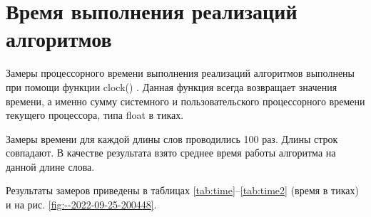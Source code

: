 \section{Время выполнения реализаций алгоритмов}

Замеры процессорного времени выполнения реализаций алгоритмов выполнены 
при помощи функции clock() \cite{cpplangtime}. Данная функция всегда возвращает значения времени, а именно сумму системного и пользовательского процессорного времени текущего процессора, типа float в тиках.

Замеры времени для каждой длины слов проводились 100 раз. Длины строк совпадают. В качестве результата взято среднее время работы алгоритма на данной длине слова.

Результаты замеров приведены в таблицах \ref{tab:time}--\ref{tab:time2} (время в тиках) и на рис. \ref{fig:--2022-09-25-200448}.

